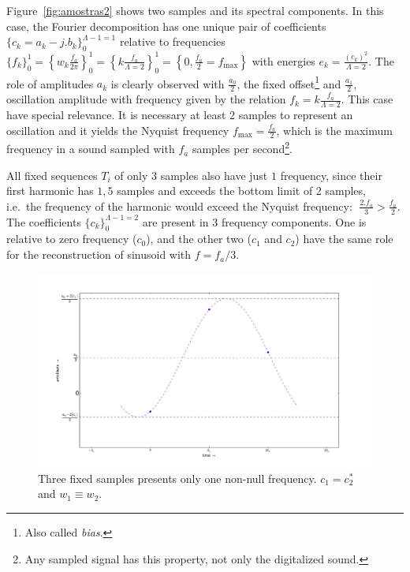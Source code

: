\documentclass[
 aip,
 jmp,
 amsmath,amssymb,
 reprint,
]{revtex4-1}
\begin{document}
Figure~\ref{fig:amostras2} shows two samples and its spectral components. In this case, the Fourier decomposition has one unique pair of coefficients $\{c_k=a_k-j.b_k\}_0^{\Lambda-1=1}$ relative to frequencies $\{f_k\}_0^1=\left\{w_k\frac{f_a}{2\pi}\right\}_0^1=\left\{k\frac{f_a}{\Lambda=2}\right\}_0^1=\left\{0,\frac{f_a}{2}=f_{\text{max}}\right\}$
with energies $e_k=\frac{(c_k)^2}{\Lambda=2}$. The role of amplitudes $a_k$ is clearly observed with $\frac{a_0}{2}$, the fixed offset\footnote{Also called \emph{bias}.} and $\frac{a_1}{2}$, oscillation amplitude with frequency given by the relation $f_k=k \frac{f_a}{\Lambda=2}$.
This case have special relevance. It is necessary at least 2 samples to represent an oscillation and it yields the Nyquist frequency $f_{\text{max}}=\frac{f_a}{2}$, which is the maximum frequency in a sound sampled with $f_a$ samples per second\footnote{Any sampled signal has this property, not only the digitalized sound.}.

All fixed sequences $T_i$ of only $3$ samples also have just $1$ frequency, since their first harmonic has $1,5$ samples and exceeds the bottom limit of 2 samples, i.e.\ the frequency of the harmonic would exceed the Nyquist frequency:  $\; \frac{2. f_a}{3} > \frac{f_a}{2} $. 
The coefficients $\{c_k\}_0^{\Lambda-1=2}$ are present in 3 frequency components. One is relative to zero frequency ($c_0$), and the other two ($c_1$ and $c_2$) have the same role for the reconstruction of sinusoid with $f=f_a/3$.

 \begin{figure}[h!]
     \centering
         \includegraphics[width=\columnwidth]{figures/amostras3b}
     \caption{Three fixed samples presents only one non-null frequency. $c_1=c_2^*$ and $w_1 \equiv w_2$.}
         \label{fig:amostras3}
 \end{figure}
\end{document}
